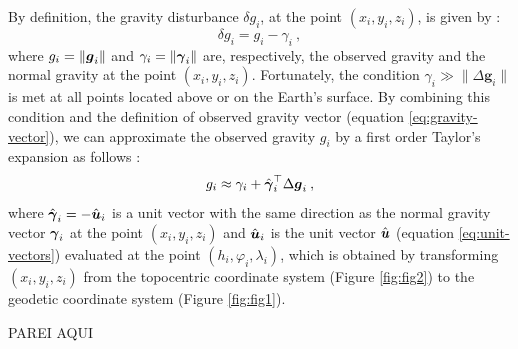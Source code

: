\documentclass[extra]{gji}
\begin{document}
By definition, the gravity disturbance $\delta g_{i}$,
at the point $(x_{i}, y_{i}, z_{i})$, is given by 
\citep{hofmann-wellenhof-moritz2005}:
\begin{equation}
\delta g_{i} =  g_{i} - \gamma_{i} \: ,
\label{eq:gravity-disturbance}
\end{equation}
where $g_{i} = \| \mitbf{g}_{i} \|$ and 
$\gamma_{i} = \| \mitbf{\gamma}_{i} \|$ are,
respectively, the observed gravity and the normal gravity at the
point $(x_{i}, y_{i}, z_{i})$.
Fortunately, the condition 
$\gamma_{i} \gg \| \Delta \mathbf{g}_{i} \|$ 
is met at all points located above or on the Earth's surface.
By combining this condition and the definition of observed gravity vector
(equation \ref{eq:gravity-vector}), we can approximate the observed gravity
$g_{i}$ by a first order Taylor's expansion as follows 
\citep{sanso_sideris2013}:
\begin{equation}
g_{i} \approx \gamma_{i} + 
\hat{\mitbf{\gamma}}_{i}^{\top} \Delta \mitbf{g}_{i} \: ,
\label{eq:gobs-approx}
\end{equation}
where $\hat{\mitbf{\gamma}}_{i} = -\hat{\mitbf{u}}_{i}$ is a unit 
vector with the same direction as the normal gravity vector 
$\mitbf{\gamma}_{i}$ at the point $(x_{i}, y_{i}, z_{i})$ and
$\hat{\mitbf{u}}_{i}$ is the unit vector $\hat{\mitbf{u}}$ 
(equation \ref{eq:unit-vectors}) evaluated at the point $(h_{i}, \varphi_{i}, \lambda_{i})$, which is obtained by transforming $(x_{i}, y_{i}, z_{i})$
from the topocentric coordinate system (Figure \ref{fig:fig2}) to the
geodetic coordinate system (Figure \ref{fig:fig1}).

PAREI AQUI
\end{document}
